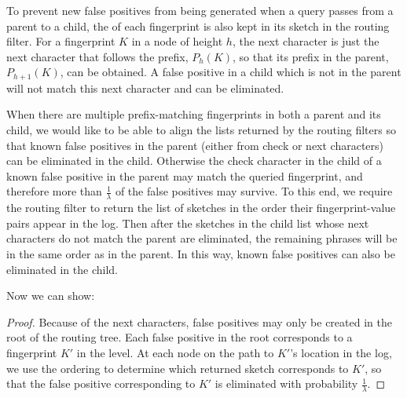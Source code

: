 To prevent new false positives from being generated when a query passes from a
parent to a child, the  of each fingerprint is also kept
in its sketch in the routing filter. For a fingerprint $K$ in a node of height
$h$, the next character is just the next character that follows the prefix,
$P_h(K)$, so that its prefix in the parent, $P_{h+1}(K)$, can be obtained. A
false positive in a child which is not in the parent will not match this next
character and can be eliminated.

When there are multiple prefix-matching fingerprints in both a parent and its
child, we would like to be able to align the lists returned by the routing
filters so that known false positives in the parent (either from check or next
characters) can be eliminated in the child. Otherwise the check character in
the child of a known false positive in the parent may match the queried
fingerprint, and therefore more than $\frac{1}{\lambda}$ of the false positives
may survive. To this end, we require the routing filter to return the list of
sketches in the order their fingerprint-value pairs appear in the log. Then
after the sketches in the child list whose next characters do not match the
parent are eliminated, the remaining phrases will be in the same order as in
the parent. In this way, known false positives can also be eliminated in the
child.

Now we can show:

\begin{proof}
	Because of the next characters, false positives may only be created in the
	root of the routing tree. Each false positive in the root corresponds to a
	fingerprint $K'$ in the level. At each node on the path to $K'$'s location
	in the log, we use the ordering to determine which returned sketch
	corresponds to $K'$, so that the false positive corresponding to $K'$ is
	eliminated with probability $\frac{1}{\lambda}$.
\end{proof}


